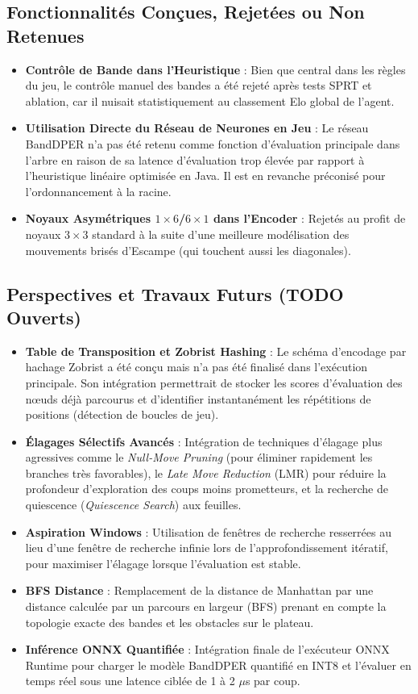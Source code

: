 \documentclass[12pt,a4paper]{article}
\begin{document}
\subsection{Fonctionnalités Conçues, Rejetées ou Non Retenues}
\begin{itemize}
    \item \textbf{Contrôle de Bande dans l'Heuristique} : Bien que central dans les règles du jeu, le contrôle manuel des bandes a été rejeté après tests SPRT et ablation, car il nuisait statistiquement au classement Elo global de l'agent.
    \item \textbf{Utilisation Directe du Réseau de Neurones en Jeu} : Le réseau BandDPER n'a pas été retenu comme fonction d'évaluation principale dans l'arbre en raison de sa latence d'évaluation trop élevée par rapport à l'heuristique linéaire optimisée en Java. Il est en revanche préconisé pour l'ordonnancement à la racine.
    \item \textbf{Noyaux Asymétriques $1\times6$/$6\times1$ dans l'Encoder} : Rejetés au profit de noyaux $3\times3$ standard à la suite d'une meilleure modélisation des mouvements brisés d'Escampe (qui touchent aussi les diagonales).
\end{itemize}

\subsection{Perspectives et Travaux Futurs (TODO Ouverts)}
\begin{itemize}
    \item \textbf{Table de Transposition et Zobrist Hashing} : Le schéma d'encodage par hachage Zobrist a été conçu mais n'a pas été finalisé dans l'exécution principale. Son intégration permettrait de stocker les scores d'évaluation des nœuds déjà parcourus et d'identifier instantanément les répétitions de positions (détection de boucles de jeu).
    \item \textbf{Élagages Sélectifs Avancés} : Intégration de techniques d'élagage plus agressives comme le \textit{Null-Move Pruning} (pour éliminer rapidement les branches très favorables), le \textit{Late Move Reduction} (LMR) pour réduire la profondeur d'exploration des coups moins prometteurs, et la recherche de quiescence (\textit{Quiescence Search}) aux feuilles.
    \item \textbf{Aspiration Windows} : Utilisation de fenêtres de recherche resserrées au lieu d'une fenêtre de recherche infinie lors de l'approfondissement itératif, pour maximiser l'élagage lorsque l'évaluation est stable.
    \item \textbf{BFS Distance} : Remplacement de la distance de Manhattan par une distance calculée par un parcours en largeur (BFS) prenant en compte la topologie exacte des bandes et les obstacles sur le plateau.
    \item \textbf{Inférence ONNX Quantifiée} : Intégration finale de l'exécuteur ONNX Runtime pour charger le modèle BandDPER quantifié en INT8 et l'évaluer en temps réel sous une latence ciblée de 1 à 2 $\mu$s par coup.
\end{itemize}
\end{document}
